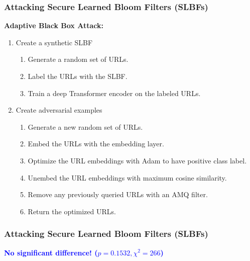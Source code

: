 \documentclass{beamer}
\begin{document}
\begin{frame}
\frametitle{Attacking Secure Learned Bloom Filters (SLBFs)}

\textbf{Adaptive Black Box Attack:}
\begin{enumerate}
    \item Create a synthetic SLBF
    \begin{enumerate}
        \item Generate a random set of URLs.
        \item Label the URLs with the SLBF.
        \item Train a deep Transformer encoder on the labeled URLs.
    \end{enumerate}
    \item Create adversarial examples
    \begin{enumerate}
        \item Generate a new random set of URLs.
        \item Embed the URLs with the embedding layer.
        \item Optimize the URL embeddings with Adam to have positive class label.
        \item Unembed the URL embeddings with maximum cosine similarity.
        \item Remove any previously queried URLs with an AMQ filter.
        \item Return the optimized URLs.
    \end{enumerate}
\end{enumerate}

\end{frame}


\begin{frame}
\frametitle{Attacking Secure Learned Bloom Filters (SLBFs)}

\begin{center}

    \textcolor{blue}{\textbf{No significant difference! ($p = 0.1532, \chi^2 = 266$)}}
\end{center}

\end{frame}
\end{document}
